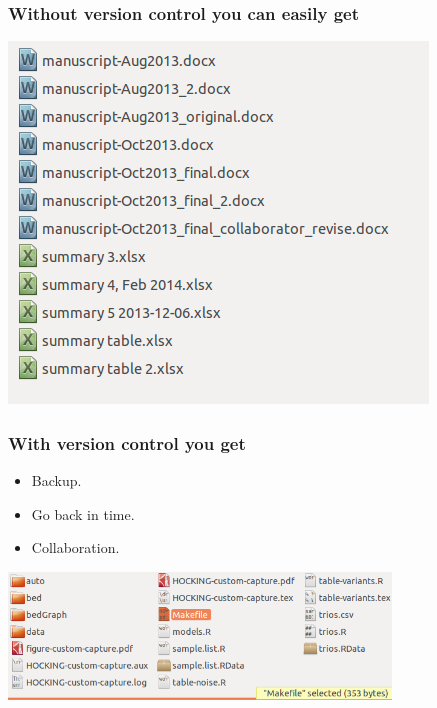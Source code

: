 \documentclass{beamer}
\begin{document}
\begin{frame}
  \frametitle{Without version control you can easily get}
  \includegraphics[width=\textwidth]{screenshot-avoid}
\end{frame}



\begin{frame}
  \frametitle{With version control you get}
  \begin{itemize}
  \item Backup.
  \item Go back in time.
  \item Collaboration.
  \end{itemize}
  \includegraphics[width=4in]{screenshot-makefile}  
\end{frame}
\end{document}
